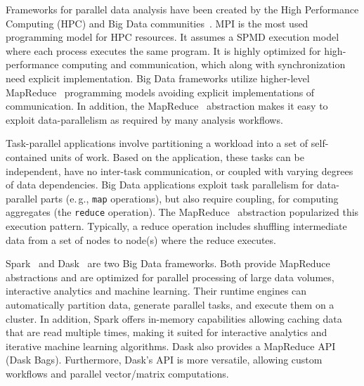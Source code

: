 Frameworks for parallel data analysis have been created by the High Performance Computing (HPC) and Big Data communities~\cite{kamburugamuve2017anatomy}.
MPI is the most used programming model for HPC resources.
It assumes a SPMD execution model where each process executes the same program.
It is highly optimized for high-performance computing and communication, which along with synchronization need explicit implementation.
Big Data frameworks utilize higher-level MapReduce~\cite{dean2004mapreduce} programming models avoiding explicit implementations of communication.
In addition, the MapReduce~\cite{dean2004mapreduce} abstraction makes it easy to exploit data-parallelism as required by many analysis workflows.

Task-parallel applications involve partitioning a workload into a set of self-contained units of work.
Based on the application, these tasks can be independent, have no inter-task communication, or coupled with varying degrees of data dependencies.
Big Data applications exploit task parallelism for data-parallel parts (e.\,g., \texttt{map} operations), but also require coupling, for computing aggregates (the \texttt{reduce} operation).
The MapReduce~\cite{dean2004mapreduce} abstraction popularized this execution pattern.
Typically, a reduce operation includes shuffling intermediate data from a set of nodes to node(s) where the reduce executes.

Spark~\cite{zaharia2010spark} and Dask~\cite{rocklin2015dask} are two Big Data frameworks.
Both provide MapReduce abstractions and are optimized for parallel processing of large data volumes, interactive analytics and machine learning.
Their runtime engines can automatically partition data, generate parallel tasks, and execute them on a cluster.
In addition, Spark offers in-memory capabilities allowing caching data that are read multiple times, making it suited for interactive analytics and iterative machine learning algorithms.
Dask also provides a MapReduce API (Dask Bags).
Furthermore, Dask's API is more versatile, allowing custom workflows and parallel vector/matrix computations.

